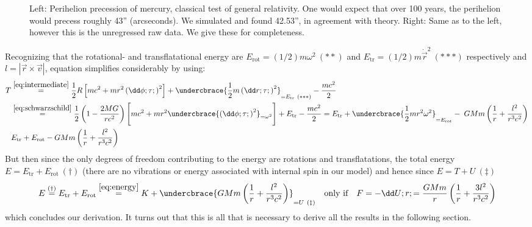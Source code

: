\documentclass[11pt,english,a4paper]{article}
\begin{document}
\begin{figure}
%  
\caption{Left: Perihelion precession of mercury, classical test of general relativity. One would expect that over 100 years, the perihelion would precess roughly 43'' (arcseconds). We simulated and found 42.53'', in agreement with theory. Right: Same as to the left, however this is the unregressed raw data. We give these for completeness.}\label{fig:grcorrection}
\end{figure}%
Recognizing that the rotational- and transflatational energy are $E_\text{rot} = (1/2)m \omega^2 \ (**)$ and $E_\text{tr} = (1/2)m \dot{\vec{r}}^2 \ (***)$ respectively and $l = |\vec{r} \times \vec{v}|$, equation simplifies considerably by using:
\begin{align}
T &\stackrel{\eqref{eq:intermediate}}{=} \frac{1}{2}R\left[ mc^2 + mr^2 \left( \dd \phi; \tau; \right)^2 \right] + \undercbrace{\frac{1}{2}m \left( \dd r; \tau; \right)^2}_{=E_\text{tr} \ (***)} - \frac{mc^2}{2} \nonumber \\
&\stackrel{\eqref{eq:schwarzschild}}{=} \frac{1}{2}\left( 1 - \frac{2MG}{r c^2} \right)\Bigg[ mc^2 + mr^2 \undercbrace{\left( \dd \phi; \tau; \right)^2}_{=\omega^2} \Bigg] + E_\text{tr} - \frac{mc^2}{2} = E_\text{tr} + \undercbrace{\frac{1}{2}mr^2\omega^2}_{=E_\text{rot}} -\;GMm\left( \frac{1}{r} + \frac{l^2}{r^3 c^2} \right)\nonumber\\
&E_\text{tr} + E_\text{rot} - GMm\left( \frac{1}{r} + \frac{l^2}{r^3 c^2} \right) \label{eq:energy}
\end{align}
But then since the only degrees of freedom contributing to the energy are rotations and transflatations, the total energy $E = E_\text{tr} + E_\text{rot} \ (\dagger)$ (there are no vibrations or energy associated with internal spin in our model) and hence since $E = T + U \ (\ddagger)$
\begin{equation}
E \stackrel{(\dagger)}{=} E_\text{tr} + E_\text{rot} \stackrel{\eqref{eq:energy}}{=} K + \undercbrace{GMm\left( \frac{1}{r} + \frac{l^2}{r^3 c^2} \right)}_{=U \ (\ddagger)} \quad \text{only if} \quad F = -\dd U;r; = \frac{GMm}{r}\left( \frac{1}{r} + \frac{3l^2}{r^3c^2} \right) \label{eq:SR}
\end{equation}
which concludes our derivation. It turns out that this is all that is necessary to derive all the results in the following section.
\end{document}

